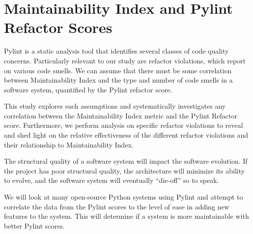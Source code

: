 \section{Maintainability Index and Pylint Refactor Scores}

Pylint is a static analysis tool that identifies several classes of code quality concerns. Particularly relevant to our study are refactor violations, which report on various code smells. We can assume that there must be some correlation between Maintainability Index and the type and number of code smells in a software system, quantified by the Pylint refactor score.

This study explores such assumptions and systematically investigates any correlation between the Maintainability Index metric and the Pylint Refactor score. Furthermore, we perform analysis on specific refactor violations to reveal and shed light on the relative effectiveness of the different refactor violations and their relationship to Maintainability Index.

The structural quality of a software system will impact the software evolution. If the project has poor structural quality, the architecture will minimize its ability to evolve, and the software system will eventually ``die-off'' so to speak.

We will look at many open-source Python systems using Pylint and attempt to correlate the data from the Pylint scores to the level of ease in adding new features to the system. This will determine if a system is more maintainable with better Pylint scores.

